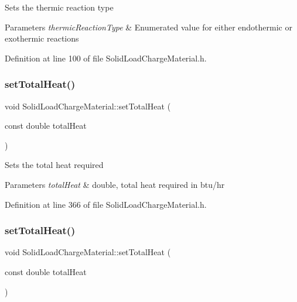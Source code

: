 Sets the thermic reaction type 
\begin{DoxyParams}{Parameters}
{\em thermic\+Reaction\+Type} & Enumerated value for either endothermic or exothermic reactions \\
\hline
\end{DoxyParams}


Definition at line 100 of file Solid\+Load\+Charge\+Material.\+h.

\mbox{\label{class_solid_load_charge_material_a624a92d35d338e4b5f130c782d48e4f7}} 
\subsubsection{\texorpdfstring{set\+Total\+Heat()}{setTotalHeat()}\hspace{0.1cm}{\footnotesize\ttfamily [1/3]}}
{\footnotesize\ttfamily void Solid\+Load\+Charge\+Material\+::set\+Total\+Heat (\begin{DoxyParamCaption}\item[{const double}]{total\+Heat }\end{DoxyParamCaption})\hspace{0.3cm}{\ttfamily [inline]}}

Sets the total heat required 
\begin{DoxyParams}{Parameters}
{\em total\+Heat} & double, total heat required in btu/hr \\
\hline
\end{DoxyParams}


Definition at line 366 of file Solid\+Load\+Charge\+Material.\+h.

\mbox{\label{class_solid_load_charge_material_a624a92d35d338e4b5f130c782d48e4f7}} 
\subsubsection{\texorpdfstring{set\+Total\+Heat()}{setTotalHeat()}\hspace{0.1cm}{\footnotesize\ttfamily [2/3]}}
{\footnotesize\ttfamily void Solid\+Load\+Charge\+Material\+::set\+Total\+Heat (\begin{DoxyParamCaption}\item[{const double}]{total\+Heat }\end{DoxyParamCaption})\hspace{0.3cm}{\ttfamily [inline]}}

